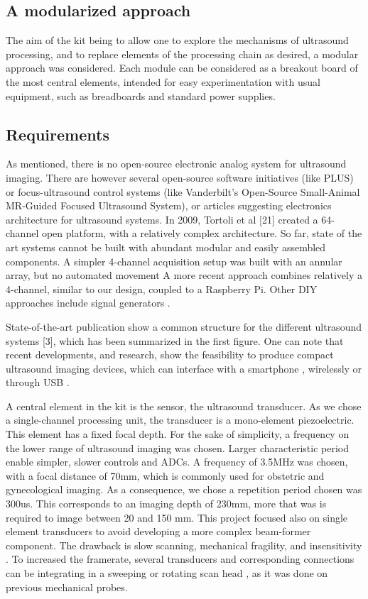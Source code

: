 \documentclass[letterpaper, 10 pt, conference]{ieeeconf} %
\begin{document}
\subsection{A modularized approach}

The aim of the kit being to allow one to explore the mechanisms of ultrasound processing, and to replace elements of the processing chain as desired, a modular approach was considered. Each module can be considered as a breakout board of the most central elements, intended for easy experimentation with usual equipment, such as breadboards and standard power supplies.

\subsection{Requirements}

As mentioned, there is no open-source electronic analog system for ultrasound imaging. There are however several open-source software initiatives (like PLUS) or focus-ultrasound control systems (like Vanderbilt's Open-Source Small-Animal MR-Guided Focused Ultrasound System), or articles suggesting electronics architecture for ultrasound systems. In 2009, Tortoli et al [21] created a 64-channel open platform, with a relatively complex architecture. So far, state of the art systems cannot be built with abundant modular and easily assembled components. A simpler 4-channel acquisition setup was built with an annular array, but no automated movement A more recent approach combines relatively a 4-channel\cite{c22}, similar to our design, coupled to a Raspberry Pi. Other DIY approaches include signal generators \cite{c23}.

State-of-the-art publication show a common structure for the different ultrasound systems [3], which has been summarized in the first figure. One can note that recent developments, and research, show the feasibility to produce compact ultrasound imaging devices, which can interface with a smartphone \cite{c8}, wirelessly or through USB \cite{c20}.

A central element in the kit is the sensor, the ultrasound transducer. As we chose a single-channel processing unit, the transducer is a mono-element piezoelectric. This element has a fixed focal depth. For the sake of simplicity, a frequency on the lower range of ultrasound imaging was chosen. Larger characteristic period enable simpler, slower controls and ADCs. A frequency of 3.5MHz was chosen, with a focal distance of 70mm, which is commonly used for obstetric and gynecological imaging. As a consequence, we chose a repetition period chosen was 300us. This corresponds to an imaging depth of 230mm, more that was is required to image between 20 and 150 mm. This project focused also on single element transducers to avoid developing a more complex beam-former component. The drawback is slow scanning, mechanical fragility, and insensitivity \cite{c12}. To increased the framerate, several transducers and corresponding connections can be integrating in a sweeping or rotating scan head \cite{c13}, as it was done on previous mechanical probes.
\end{document}
